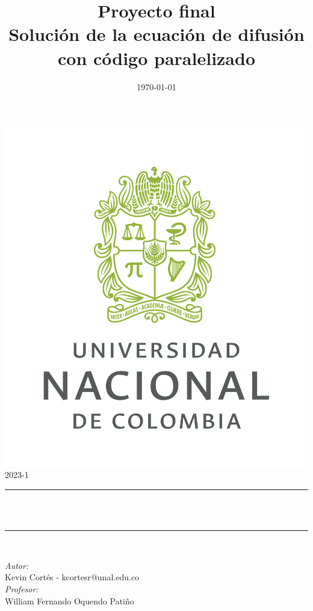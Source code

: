 \documentclass[article,latterpaper]{article}
\title{Proyecto final\\Solución de la ecuación de difusión con código paralelizado}
\author{}
\date{\today}
\makeatletter
\let\thetitle\@title
\makeatother
\begin{document}
\begin{titlepage}
  \centering
  \vspace{0.2 cm}
  \includegraphics[scale = 0.4]{PNG_LOGOSIMBOLO CENTRAL 2 COLORES (VERDE Y GRIS)-02-02-02.png} \\
  \textsc{\Large 2023-1} \\[0.5 cm]
  \rule{\linewidth}{0.2 mm} \\[0.2 cm]
  {\LARGE \bfseries \thetitle} \\
  \rule{\linewidth}{0.2 mm} \\[2 cm]
  \begin{minipage}{0.8\textwidth}
    \raggedright
    \emph{Autor:}\\
    Kevin Cortés - kcortesr@unal.edu.co\\
    \hfill\break
    \emph{Profesor:}\\
    William Fernando Oquendo Patiño\\
  \end{minipage}  
\end{titlepage}

\newpage
\begin{center}
  \tableofcontents
\end{center}
\end{document}
